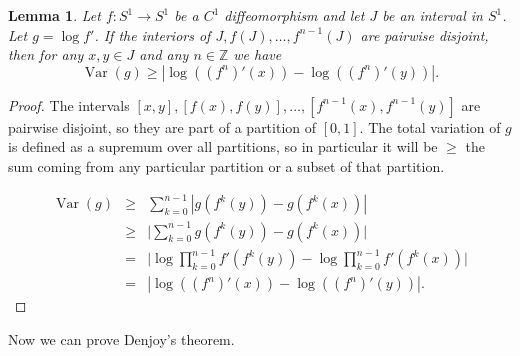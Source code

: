 \documentclass{article}
\newtheorem{lemma}[theorem]{Lemma}
\newcommand{\Var}[0]{\operatorname{Var}}
\begin{document}
\begin{lemma}
Let $f:S^1 \to S^1$ be a $C^1$ diffeomorphism and
let $J$ be an interval in $S^1$. Let $g=\log f'$. If the interiors of $J,f(J),\ldots,f^{n-1}(J)$ are pairwise
disjoint, then for any $x, y \in J$ and any $n \in \mathbb{Z}$ we have
\[
\Var(g) \geq |\log((f^n)'(x))-\log((f^n)'(y))|.
\]
\end{lemma}
\begin{proof}
The intervals $[x,y], [f(x),f(y)], \ldots, [f^{n-1}(x),f^{n-1}(y)]$ are pairwise disjoint, so
they are part of a partition of $[0,1]$. The total variation of $g$ is defined as a supremum
over all partitions, so in particular it will be $\geq$ the sum coming from any particular
partition or a subset of that partition.

\begin{eqnarray*}
\Var(g)&\geq&\sum_{k=0}^{n-1} |g(f^k(y))-g(f^k(x))|\\
&\geq&\Big| \sum_{k=0}^{n-1} g(f^k(y))-g(f^k(x)) \Big|\\
&=&\Big| \log \prod_{k=0}^{n-1} f'(f^k(y))-\log \prod_{k=0}^{n-1} f'(f^k(x)) \Big|\\
&=&|\log((f^n)'(x))-\log((f^n)'(y))|.
\end{eqnarray*}
\end{proof}

Now we can prove Denjoy's theorem.
\end{document}
